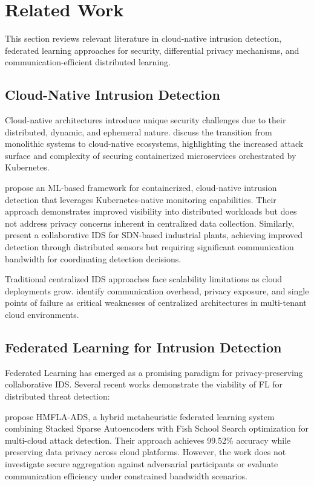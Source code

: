\section{Related Work}
\label{sec:relatedwork}

This section reviews relevant literature in cloud-native intrusion detection, federated learning approaches for security, differential privacy mechanisms, and communication-efficient distributed learning.

\subsection{Cloud-Native Intrusion Detection}

Cloud-native architectures introduce unique security challenges due to their distributed, dynamic, and ephemeral nature. \citet{boosa2025monolithic} discuss the transition from monolithic systems to cloud-native ecosystems, highlighting the increased attack surface and complexity of securing containerized microservices orchestrated by Kubernetes.

\citet{naydenov2025framework} propose an ML-based framework for containerized, cloud-native intrusion detection that leverages Kubernetes-native monitoring capabilities. Their approach demonstrates improved visibility into distributed workloads but does not address privacy concerns inherent in centralized data collection. Similarly, \citet{alenezi2026cids} present a collaborative IDS for SDN-based industrial plants, achieving improved detection through distributed sensors but requiring significant communication bandwidth for coordinating detection decisions.

Traditional centralized IDS approaches face scalability limitations as cloud deployments grow. \citet{sharma2025multi} identify communication overhead, privacy exposure, and single points of failure as critical weaknesses of centralized architectures in multi-tenant cloud environments.

\subsection{Federated Learning for Intrusion Detection}

Federated Learning has emerged as a promising paradigm for privacy-preserving collaborative IDS. Several recent works demonstrate the viability of FL for distributed threat detection:

\citet{verma2025hybrid} propose HMFLA-ADS, a hybrid metaheuristic federated learning system combining Stacked Sparse Autoencoders with Fish School Search optimization for multi-cloud attack detection. Their approach achieves 99.52\% accuracy while preserving data privacy across cloud platforms. However, the work does not investigate secure aggregation against adversarial participants or evaluate communication efficiency under constrained bandwidth scenarios.

